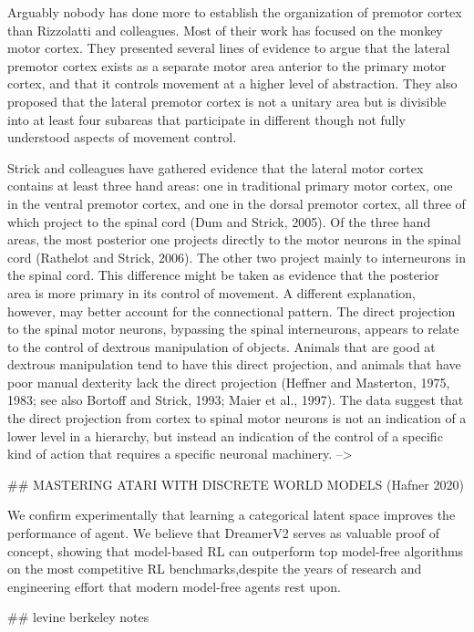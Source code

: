 \documentclass[../main.tex]{subfiles}
\begin{document}
{{Arguably nobody has done more to establish the organization of premotor cortex than Rizzolatti and colleagues. Most of their work has focused on the monkey motor cortex. They presented several lines of evidence to argue that the lateral premotor cortex exists as a separate motor area anterior to the primary motor cortex, and that it controls movement at a higher level of abstraction. They also proposed that the lateral premotor cortex is not a unitary area but is divisible into at least four subareas that participate in different though not fully understood aspects of movement control.

Strick and colleagues have gathered evidence that the lateral motor cortex contains at least three hand areas: one in traditional primary motor cortex, one in the ventral premotor cortex, and one in the dorsal premotor cortex, all three of which project to the spinal cord (Dum and Strick, 2005). Of the three hand areas, the most posterior one projects directly to the motor neurons in the spinal cord (Rathelot and Strick, 2006). The other two project mainly to interneurons in the spinal cord. This difference might be taken as evidence that the posterior area is more primary in its control of movement. A different explanation, however, may better account for the connectional pattern. The direct projection to the spinal motor neurons, bypassing the spinal interneurons, appears to relate to the control of dextrous manipulation of objects. Animals that are good at dextrous manipulation tend to have this direct projection, and animals that have poor manual dexterity lack the direct projection (Heffner and Masterton, 1975, 1983; see also Bortoff and Strick, 1993; Maier et al., 1997). The data suggest that the direct projection from cortex to spinal motor neurons is not an indication of a lower level in a hierarchy, but instead an indication of the control of a specific kind of action that requires a specific neuronal machinery. -->



## MASTERING ATARI WITH DISCRETE WORLD MODELS (Hafner 2020)

We confirm experimentally that learning a categorical latent space improves the performance of agent. We believe that DreamerV2 serves as valuable proof of concept, showing that model-based RL can outperform top model-free algorithms on the most competitive RL benchmarks,despite the years of research and engineering effort that modern model-free agents rest upon.

## levine berkeley notes

}}
\end{document}
